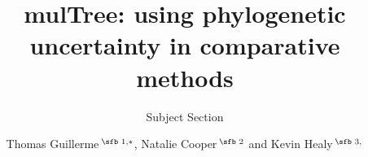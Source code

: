 \documentclass{bioinfo}
\begin{document}

\subtitle{Subject Section}

\title[mulTree]{mulTree: using phylogenetic uncertainty in comparative methods  }
\author[Guillerme \textit{et~al}.]{Thomas Guillerme\,$^{\text{\sfb 1,}*}$, Natalie Cooper\,$^{\text{\sfb 2}}$ and Kevin Healy\,$^{\text{\sfb 3,}}$}
\address{$^{\text{\sf 1}}$Silwood Park Campus, Department of Life Sciences, Imperial College London, Buckhurst Road, Ascot SL5 7PY, United Kingdom and \\
$^{\text{\sf 2}}$ Department of Life Sciences, Natural History Museum, Cromwell Road, London, SW7 5BD, United Kingdom and \\
$^{\text{\sf 3}}$ Department of Zoology, School of Natural Sciences, University of Dublin, Trinity College, Dublin, Ireland,
Country.}





\maketitle

\end{document}
